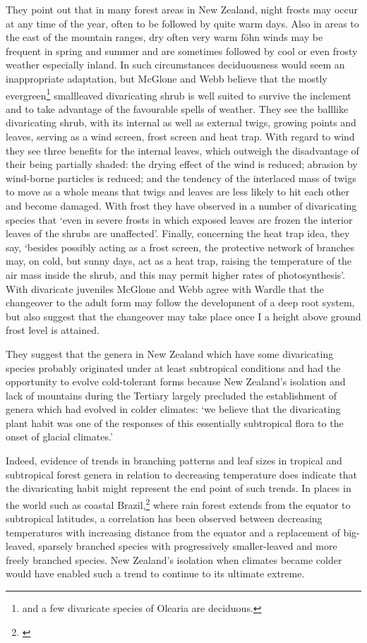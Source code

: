 They point out that in many forest areas in New Zealand, night frosts may occur at any time of the year, often to be followed by quite warm days.
Also in areas to the east of the mountain ranges, dry often very warm föhn winds may be frequent in spring and summer and are sometimes followed by cool or even frosty weather especially inland.
In such circumstances deciduousness would seem an inappropriate adaptation, but McGlone and Webb believe that the mostly evergreen\footnote{ and a few divaricate species of Olearia are deciduous.} smallleaved divaricating shrub is well suited to survive the inclement and to take advantage of the favourable spells of weather.
They see the balllike divaricating shrub, with its internal as well as external twigs, growing points and leaves, serving as a wind screen, frost screen and heat trap.
With regard to wind they see three benefits for the internal leaves, which outweigh the disadvantage of their being partially shaded: the drying effect of the wind is reduced; abrasion by wind-borne particles is reduced; and the tendency of the interlaced mass of twigs to move as a whole means that twigs and leaves are less likely to hit each other and become damaged.
With frost they have observed in a number of divaricating species that `even in severe frosts in which exposed leaves are frozen the interior leaves of the shrubs are unaffected'.
Finally, concerning the heat trap idea, they say, `besides possibly acting as a frost screen, the protective network of branches may, on cold, but sunny days, act as a heat trap, raising the temperature of the air mass inside the shrub, and this may permit higher rates of photosynthesis'.
With divaricate juveniles McGlone and Webb agree with Wardle that the changeover to the adult form may follow the development of a deep root system, but also suggest that the changeover may take place once I a height above ground frost level is attained.

They suggest that the genera in New Zealand which have some divaricating species probably originated under at least subtropical conditions and had the opportunity to evolve cold-tolerant forms because New Zealand's isolation and lack of mountains during the Tertiary largely precluded the establishment of genera which had evolved in colder climates: `we believe that the divaricating plant habit was one of the responses of this essentially subtropical flora to the onset of glacial climates.'

Indeed, evidence of trends in branching patterns and leaf sizes in tropical and subtropical forest genera in relation to decreasing temperature does indicate that the divaricating habit might represent the end point of such trends.
In places in the world such as coastal Brazil,\footnote{\cite{cain1956applications}} where rain forest extends from the equator to subtropical latitudes, a correlation has been observed between decreasing temperatures with increasing distance from the equator and a replacement of big-leaved, sparsely branched species with progressively smaller-leaved and more freely branched species.
New Zealand's isolation when climates became colder would have enabled such a trend to continue to its ultimate extreme.

